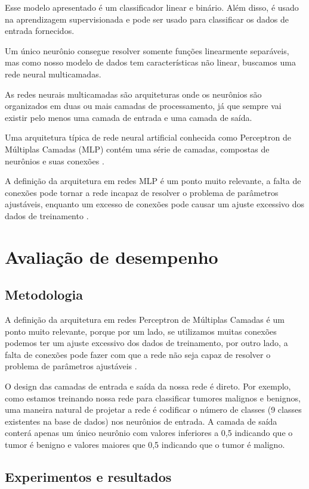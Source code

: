 \documentclass[conference]{IEEEtran}
\begin{document}
    Esse modelo apresentado é um classificador linear e binário. Além disso, é usado na aprendizagem supervisionada e pode ser usado para classificar os dados de entrada fornecidos.
    
    Um único neurônio consegue resolver somente funções linearmente separáveis, mas como nosso modelo de dados tem características não linear, buscamos uma rede neural multicamadas.
    
    As redes neurais multicamadas são arquiteturas onde os neurônios são organizados em
    duas ou mais camadas de processamento, já que sempre vai existir pelo menos uma camada
    de entrada e uma camada de saída. 
    
    Uma arquitetura típica de rede neural artificial conhecida como Perceptron de Múltiplas Camadas (MLP) contém uma série de camadas, compostas de neurônios e suas conexões \cite{b14}. 
    
    A definição da arquitetura em redes MLP é um ponto muito relevante, a falta de conexões pode tornar a rede incapaz de resolver o problema de parâmetros ajustáveis, enquanto um excesso de conexões pode causar um ajuste excessivo dos dados de treinamento \cite{rede_neural}.
  
   \section{Avaliação de desempenho}
	 \subsection{Metodologia}

A definição da arquitetura em redes Perceptron de Múltiplas Camadas é um ponto muito relevante, porque por um lado, se utilizamos muitas conexões podemos ter um ajuste excessivo dos dados de treinamento, por outro lado, a falta de conexões pode fazer com que a rede não seja capaz de resolver o problema de parâmetros ajustáveis \cite{b7}.

    O design das camadas de entrada e saída da nossa rede é direto. Por exemplo, como estamos treinando nossa rede para classificar tumores malignos e benignos, uma maneira natural de projetar a rede é codificar o número de classes (9 classes existentes na base de dados) nos neurônios de entrada. A camada de saída conterá apenas um único neurônio com valores inferiores a 0,5 indicando que  o tumor é benigno e valores maiores que 0,5 indicando que o tumor é maligno.
\subsection{Experimentos e resultados}
\end{document}
